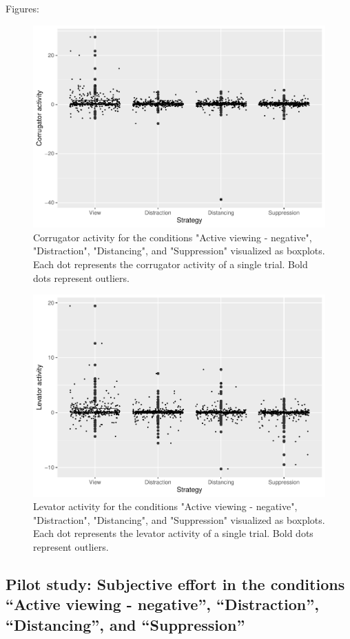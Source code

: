 \documentclass[
  english,
  man,floatsintext]{apa6}
\begin{document}
Figures:

\begin{figure}[H]
\includegraphics[width=0.75\linewidth]{Manuscript_ERED_Stage1_files/figure-latex/FigEMGCorrRegPilot-1} \caption{Corrugator activity for the conditions "Active viewing - negative", "Distraction", "Distancing", and "Suppression" visualized as boxplots. Each dot represents the corrugator activity of a single trial. Bold dots represent outliers.}\label{fig:FigEMGCorrRegPilot}
\end{figure}
\begin{figure}[H]
\includegraphics[width=0.75\linewidth]{Manuscript_ERED_Stage1_files/figure-latex/FigEMGLevRegPilot-1} \caption{Levator activity for the conditions "Active viewing - negative", "Distraction", "Distancing", and "Suppression" visualized as boxplots. Each dot represents the levator activity of a single trial. Bold dots represent outliers.}\label{fig:FigEMGLevRegPilot}
\end{figure}

\hypertarget{pilot-study-subjective-effort-in-the-conditions-active-viewing---negative-distraction-distancing-and-suppression}{%
\subsection{Pilot study: Subjective effort in the conditions ``Active viewing - negative'', ``Distraction'', ``Distancing'', and ``Suppression''}\label{pilot-study-subjective-effort-in-the-conditions-active-viewing---negative-distraction-distancing-and-suppression}}
\end{document}
